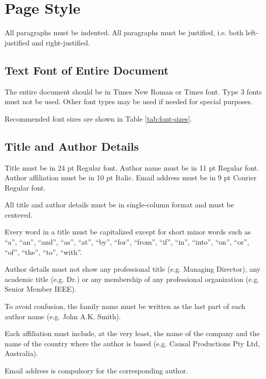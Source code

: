 \documentclass[10pt,conference,a4paper]{IEEEtran}
\begin{document}
\section{Page Style}
\label{sec:page style}

All paragraphs must be indented.  All paragraphs must be
justified, i.e. both left-justified and right-justified. 

\subsection{Text Font of Entire Document}

The entire document should be in Times New Roman or Times font.
Type 3 fonts must not be used.  Other font types may be used if
needed for special purposes.  

Recommended font sizes are shown in Table \ref{tab:font-sizes}.

\subsection{Title and Author Details}
\label{sec:title and author details}

Title must be in 24 pt Regular font.  Author name must be in 11
pt Regular font.  Author affiliation must be in 10 pt Italic.
Email address must be in 9 pt Courier Regular font.  

All title and author details must be in single-column format and
must be centered. 

Every word in a title must be capitalized except for short minor
words such as ``a'', ``an'', ``and'', ``as'', ``at'', ``by'', ``for'', ``from'',
``if'', ``in'', ``into'', ``on'', ``or'', ``of'', ``the'', ``to'', ``with''.  

Author details must not show any professional title (e.g.
Managing Director), any academic title (e.g. Dr.) or any
membership of any professional organization (e.g. Senior
Member IEEE).

To avoid confusion, the family name must be written as the
last part of each author name (e.g. John A.K. Smith).

Each affiliation must include, at the very least, the name of
the company and the name of the country where the author is
based (e.g. Causal Productions Pty Ltd, Australia).  

Email address is compulsory for the corresponding author.
\end{document}
